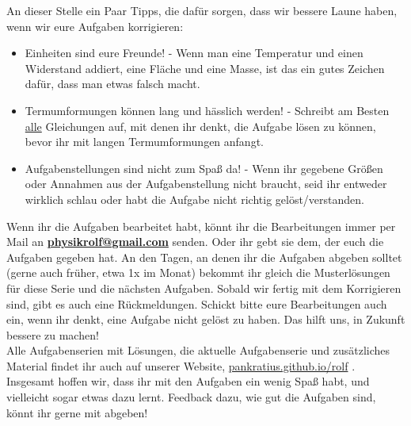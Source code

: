 \documentclass[a4paper]{article}
\begin{document}
An dieser Stelle ein Paar Tipps, die dafür sorgen, dass wir bessere Laune haben, wenn wir eure Aufgaben korrigieren:
\begin{itemize}
	\item Einheiten sind eure Freunde! - Wenn man eine Temperatur und einen Widerstand addiert, eine Fläche und eine Masse, ist das ein gutes Zeichen dafür, dass man etwas falsch macht.
	\item Termumformungen können lang und hässlich werden! - Schreibt am Besten \underline{alle} Gleichungen auf, mit denen ihr denkt, die Aufgabe lösen zu können, bevor ihr mit langen Termumformungen anfangt.
	\item Aufgabenstellungen sind nicht zum Spaß da! - Wenn ihr gegebene Größen oder Annahmen aus der Aufgabenstellung nicht braucht, seid ihr entweder wirklich schlau oder habt die Aufgabe nicht richtig gelöst/verstanden.
\end{itemize}
Wenn ihr die Aufgaben bearbeitet habt, könnt ihr die Bearbeitungen immer per Mail an \textbf{ \href{mailto:physikrolf@gmail.com}{physikrolf@gmail.com}} senden. Oder ihr gebt sie dem, der euch die Aufgaben gegeben hat. An den Tagen, an denen ihr die Aufgaben abgeben solltet (gerne auch früher, etwa 1x im Monat) bekommt ihr gleich die Musterlösungen für diese Serie und die nächsten Aufgaben. Sobald wir fertig mit dem Korrigieren sind, gibt es auch eine Rückmeldungen. Schickt bitte eure Bearbeitungen auch ein, wenn ihr denkt, eine Aufgabe nicht gelöst zu haben. Das hilft uns, in Zukunft bessere zu machen!\\
Alle Aufgabenserien mit Lösungen, die aktuelle Aufgabenserie und zusätzliches Material findet ihr auch auf unserer Website, \url{pankratius.github.io/rolf} .
Insgesamt hoffen wir, dass ihr mit den Aufgaben ein wenig Spaß habt, und vielleicht sogar etwas dazu lernt. Feedback dazu, wie gut die Aufgaben sind, könnt ihr gerne mit abgeben!
\end{document}
